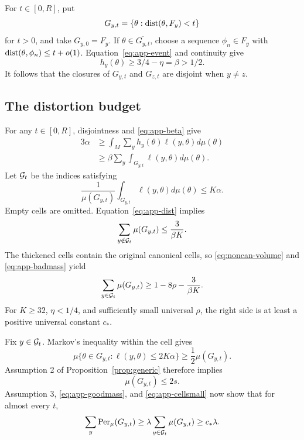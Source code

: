 For $t\in[0,R]$, put
\[
 G_{y,t}=\{\theta:\operatorname{dist}(\theta,F_y)<t\}
\]
for $t>0$, and take $G_{y,0}=F_y$.
If $\theta\in\overline{G_{y,t}}$, choose a sequence $\phi_n\in F_y$ with
$\operatorname{dist}(\theta,\phi_n)\le t+o(1)$.
Equation~\eqref{eq:app-event} and continuity give
\begin{equation}
 h_y(\theta)\ge 3/4-\eta=\beta>1/2.
 \label{eq:app-beta}
\end{equation}
It follows that the closures of $G_{y,t}$ and $G_{z,t}$ are disjoint when $y\ne z$.

\subsection{The distortion budget}

For any $t\in[0,R]$, disjointness and \eqref{eq:app-beta} give
\begin{align}
 3\alpha
 &\ge \int_M\sum_y h_y(\theta)\ell(y,\theta)d\mu(\theta)\nonumber\\
 &\ge \beta\sum_y\int_{G_{y,t}}\ell(y,\theta)d\mu(\theta).
 \label{eq:app-dist}
\end{align}
Let $\mathcal G_t$ be the indices satisfying
\[
 \frac{1}{\mu(G_{y,t})}
 \int_{G_{y,t}}\ell(y,\theta)d\mu(\theta)
 \le K\alpha.
\]
Empty cells are omitted.
Equation~\eqref{eq:app-dist} implies
\begin{equation}
 \sum_{y\notin\mathcal G_t}\mu(G_{y,t})
 \le\frac{3}{\beta K}.
 \label{eq:app-badmass}
\end{equation}
The thickened cells contain the original canonical cells, so \eqref{eq:noncan-volume} and \eqref{eq:app-badmass} yield
\begin{equation}
 \sum_{y\in\mathcal G_t}\mu(G_{y,t})
 \ge 1-8\rho-\frac{3}{\beta K}.
 \label{eq:app-goodmass}
\end{equation}
For $K\ge32$, $\eta<1/4$, and sufficiently small universal $\rho$, the right side is at least a positive universal constant $c_*$.

Fix $y\in\mathcal G_t$.
Markov's inequality within the cell gives
\[
 \mu\{\theta\in G_{y,t}:\ell(y,\theta)\le2K\alpha\}
 \ge\frac12\mu(G_{y,t}).
\]
Assumption 2 of Proposition~\ref{prop:generic} therefore implies
\begin{equation}
 \mu(G_{y,t})\le2s.
 \label{eq:app-cellsmall}
\end{equation}
Assumption 3, \eqref{eq:app-goodmass}, and \eqref{eq:app-cellsmall} now show that for almost every $t$,
\begin{equation}
 \sum_y\operatorname{Per}_\mu(G_{y,t})
 \ge \lambda\sum_{y\in\mathcal G_t}\mu(G_{y,t})
 \ge c_*\lambda.
 \label{eq:app-per}
\end{equation}

